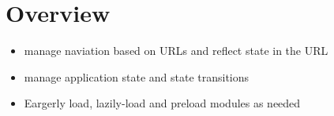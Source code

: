 \section{Overview}


\begin{itemize}
  \item manage naviation based on URLs and reflect state in the URL
  \item manage application state and state transitions
  \item Eargerly load, lazily-load and preload modules as needed
\end{itemize}
